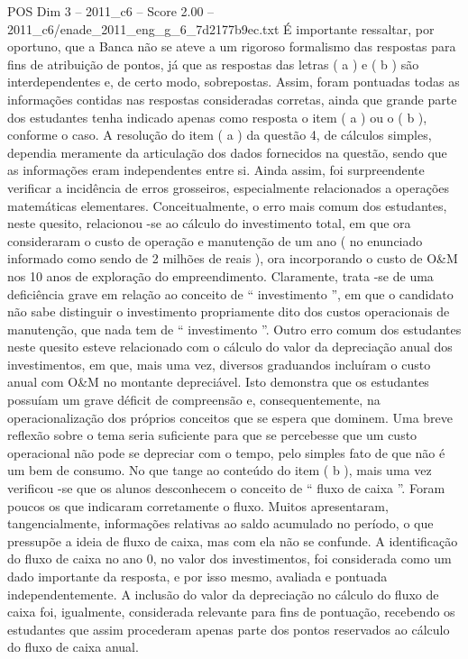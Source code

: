 \begin{textsample}{POS Dim 3 – 2011\_c6 – Score 2.00 – 2011\_c6/enade\_2011\_eng\_g\_6\_7d2177b9ec.txt}
É importante ressaltar, por oportuno, que a Banca não se ateve a um rigoroso formalismo das respostas para fins de atribuição de pontos, já que as respostas das letras ( a ) e ( b ) são interdependentes e, de certo modo, sobrepostas.
Assim, foram pontuadas todas as informações contidas nas respostas consideradas corretas, ainda que grande parte dos estudantes tenha indicado apenas como resposta o item ( a ) ou o ( b ), conforme o caso.
A resolução do item ( a ) da questão 4, de cálculos simples, dependia meramente da articulação dos dados fornecidos na questão, sendo que as informações eram independentes entre si.
Ainda assim, foi surpreendente verificar a incidência de erros grosseiros, especialmente relacionados a operações matemáticas elementares.
Conceitualmente, o erro mais comum dos estudantes, neste quesito, relacionou -se ao cálculo do investimento total, em que ora consideraram o custo de operação e manutenção de um ano ( no enunciado informado como sendo de 2 milhões de reais ), ora incorporando o custo de O\&M nos 10 anos de exploração do empreendimento.
Claramente, trata -se de uma deficiência grave em relação ao conceito de “ investimento ”, em que o candidato não sabe distinguir o investimento propriamente dito dos custos operacionais de manutenção, que nada tem de “ investimento ”.
Outro erro comum dos estudantes neste quesito esteve relacionado com o cálculo do valor da depreciação anual dos investimentos, em que, mais uma vez, diversos graduandos incluíram o custo anual com O\&M no montante depreciável.
Isto demonstra que os estudantes possuíam um grave déficit de compreensão e, consequentemente, na operacionalização dos próprios conceitos que se espera que dominem.
Uma breve reflexão sobre o tema seria suficiente para que se percebesse que um custo operacional não pode se depreciar com o tempo, pelo simples fato de que não é um bem de consumo.
No que tange ao conteúdo do item ( b ), mais uma vez verificou -se que os alunos desconhecem o conceito de “ fluxo de caixa ”.
Foram poucos os que indicaram corretamente o fluxo.
Muitos apresentaram, tangencialmente, informações relativas ao saldo acumulado no período, o que pressupõe a ideia de fluxo de caixa, mas com ela não se confunde.
A identificação do fluxo de caixa no ano 0, no valor dos investimentos, foi considerada como um dado importante da resposta, e por isso mesmo, avaliada e pontuada independentemente.
A inclusão do valor da depreciação no cálculo do fluxo de caixa foi, igualmente, considerada relevante para fins de pontuação, recebendo os estudantes que assim procederam apenas parte dos pontos reservados ao cálculo do fluxo de caixa anual.

\end{textsample}

